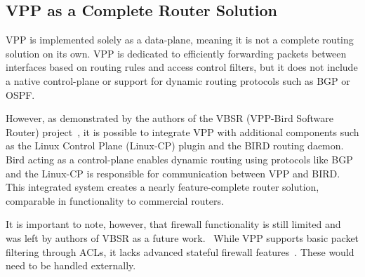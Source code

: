 \subsection{VPP as a Complete Router Solution}
VPP is implemented solely as a data-plane, meaning it is not a complete routing solution on its own. 
VPP is dedicated to efficiently forwarding packets between interfaces based on routing rules and access control filters, 
but it does not include a native control-plane or support for dynamic routing protocols such as BGP or OSPF.

However, as demonstrated by the authors of the VBSR (VPP-Bird Software Router) project~\cite{10819057}, 
it is possible to integrate VPP with additional components such as the Linux Control Plane (Linux-CP) plugin and the BIRD routing daemon. 
Bird acting as a control-plane enables dynamic routing using protocols like BGP 
and the Linux-CP is responsible for communication between VPP and BIRD. 
This integrated system creates a nearly feature-complete router solution, comparable in functionality to commercial routers.

It is important to note, however, that firewall functionality is still limited and was left by authors of VBSR as a future work.~\cite{10819057} 
While VPP supports basic packet filtering through ACLs, it lacks advanced stateful firewall features~\cite{fdio-vpp-features-2502}. These would need to be handled externally.

